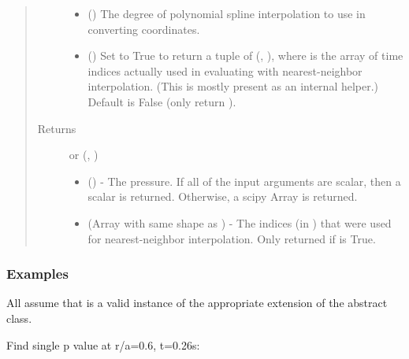\documentclass[letterpaper,10pt,english]{sphinxmanual}
\begin{document}
\begin{fulllineitems}
\begin{fulllineitems}
\begin{quote}
\begin{description}
\begin{itemize}
\item {} 
 () \textendash{} The degree of polynomial spline interpolation to
use in converting coordinates.

\item {} 
 () \textendash{} Set to True to return a tuple of (,
), where  is the array of time indices
actually used in evaluating  with nearest-neighbor
interpolation. (This is mostly present as an internal helper.)
Default is False (only return ).

\end{itemize}

\item[{Returns}] \leavevmode

 or (, )
\begin{itemize}
\item {} 
 () - The pressure. If
all of the input arguments are scalar, then a scalar is returned.
Otherwise, a scipy Array is returned.

\item {} 
 (Array with same shape as ) - The indices
(in ) that were used for
nearest-neighbor interpolation. Only returned if  is
True.

\end{itemize}


\end{description}\end{quote}
\subsubsection*{Examples}

All assume that  is a valid instance of the appropriate
extension of the {\hyperref[\detokenize{eqtools:eqtools.core.Equilibrium}]{}} abstract class.

Find single p value at r/a=0.6, t=0.26s:

\begin{sphinxVerbatim}[commandchars=\\\{\}]
   
\end{sphinxVerbatim}


\end{fulllineitems}
\end{fulllineitems}
\end{document}
